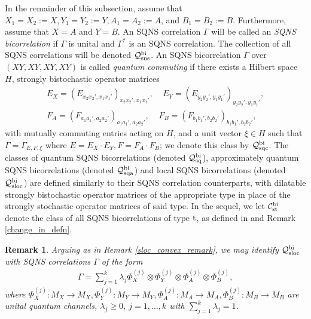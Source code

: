 \documentclass[11pt]{amsart}
\newtheorem{remark}[theorem]{Remark}
\newcommand{\cl}[1]{\mathcal{#1}}
\begin{document}
In the remainder of this subsection, assume that $X_{1} = X_{2} := X, Y_{1} = Y_{2} := Y, A_{1} = A_{2} := A$, and $B_{1} = B_{2} := B$. Furthermore, assume that $X = A$ and $Y = B$. An SQNS correlation $\Gamma$ will be called an \textit{SQNS bicorrelation} if $\Gamma$ is unital and $\Gamma^{*}$ is an SQNS correlation. The collection of all SQNS correlations will be denoted $\cl{Q}_{\rm sns}^{\rm bi}$. An SQNS bicorrelation $\Gamma$ over $(XY, XY, XY, XY)$ is called \textit{quantum commuting} if there exists a Hilbert space $H$, strongly bistochastic operator matrices 
\begin{gather*}
	E_{X} = (E_{x_{2}x_{2}', x_{1}x_{1}'})_{x_{2}x_{2}', x_{1}x_{1}'}, \;\;\;\; E_{Y} = (E_{y_{2}y_{2}', y_{1}y_{1}'})_{y_{2}y_{2}', y_{1}y_{1}'}, 
\\	F_{A} = (F_{a_{1}a_{1}', a_{2}a_{2}'})_{a_{1}a_{1}', a_{2}a_{2}'}, \;\;\;\; F_{B} = (F_{b_{1}b_{1}', b_{2}b_{2}'})_{b_{1}b_{1}', b_{2}b_{2}'},
\end{gather*}
\noindent with mutually commuting entries acting on $H$, and a unit vector $\xi \in H$ such that $\Gamma = \Gamma_{E, F, \xi}$ where $E = E_{X}\cdot E_{Y}, F = F_{A}\cdot F_{B}$; we denote this class by $\cl{Q}_{\rm sqc}^{\rm bi}$. The classes of quantum SQNS bicorrelations  (denoted $\cl{Q}_{\rm sq}^{\rm bi}$), approximately quantum SQNS bicorrelations (denoted $\cl{Q}_{\rm sqa}^{\rm bi}$) and local SQNS bicorrelations (denoted $\cl{Q}_{\rm sloc}^{\rm bi}$) are defined similarly to their SQNS correlation counterparts, with dilatable strongly bistochastic operator matrices of the appropriate type in place of the strongly stochastic operator matrices of said type. In the sequel, we let $\cl{C}_{\rm st}^{\rm bi}$ denote the class of all SQNS bicorrelations of type ${\rm t}$, as defined in \cite[Section 6]{gt_one} and Remark \ref{change_in_defn}.

\begin{remark}\label{bisloc_convex_remark}
\rm Arguing as in Remark \ref{sloc_convex_remark}, we may identify $\cl{Q}_{\rm sloc}^{\rm bi}$ with SQNS correlations $\Gamma$ of the form
\begin{gather*}
	\Gamma = \sum\limits_{j=1}^{k}\lambda_{j}\Phi_{X}^{(j)}\otimes\Phi_{Y}^{(j)}\otimes\Phi_{A}^{(j)}\otimes \Phi_{B}^{(j)},
\end{gather*}
\noindent where $\Phi_{X}^{(j)}: M_{X}\rightarrow M_{X}, \Phi_{Y}^{(j)}: M_{Y}\rightarrow M_{Y}, \Phi_{A}^{(j)}: M_{A}\rightarrow M_{A}, \Phi_{B}^{(j)}: M_{B}\rightarrow M_{B}$ are unital quantum channels, $\lambda_{j} \geq 0$, $j = 1, \hdots, k$ with $\sum_{j=1}^{k}\lambda_{j} = 1$.
\end{remark}
\end{document}
